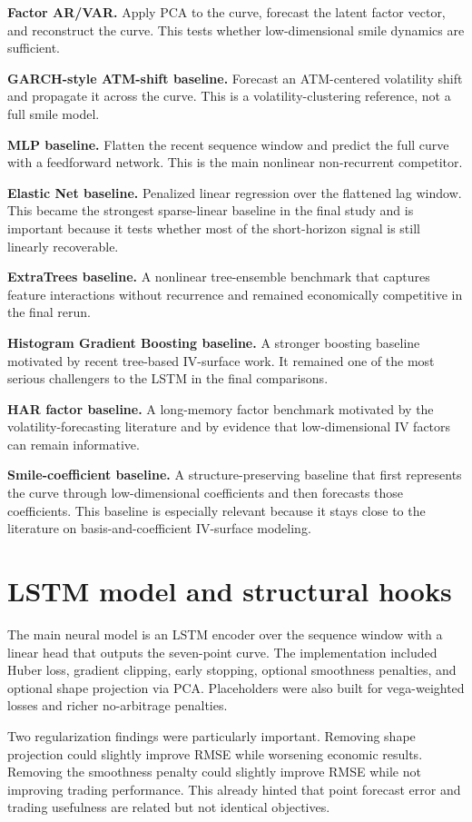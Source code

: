 \documentclass[12pt]{report}
\begin{document}
\textbf{Factor AR/VAR.} Apply PCA to the curve, forecast the latent factor vector, and reconstruct the curve. This tests whether low-dimensional smile dynamics are sufficient.

\textbf{GARCH-style ATM-shift baseline.} Forecast an ATM-centered volatility shift and propagate it across the curve. This is a volatility-clustering reference, not a full smile model.

\textbf{MLP baseline.} Flatten the recent sequence window and predict the full curve with a feedforward network. This is the main nonlinear non-recurrent competitor.

\textbf{Elastic Net baseline.} Penalized linear regression over the flattened lag window. This became the strongest sparse-linear baseline in the final study and is important because it tests whether most of the short-horizon signal is still linearly recoverable.

\textbf{ExtraTrees baseline.} A nonlinear tree-ensemble benchmark that captures feature interactions without recurrence and remained economically competitive in the final rerun.

\textbf{Histogram Gradient Boosting baseline.} A stronger boosting baseline motivated by recent tree-based IV-surface work. It remained one of the most serious challengers to the LSTM in the final comparisons.

\textbf{HAR factor baseline.} A long-memory factor benchmark motivated by the volatility-forecasting literature and by evidence that low-dimensional IV factors can remain informative.

\textbf{Smile-coefficient baseline.} A structure-preserving baseline that first represents the curve through low-dimensional coefficients and then forecasts those coefficients. This baseline is especially relevant because it stays close to the literature on basis-and-coefficient IV-surface modeling.

\section{LSTM model and structural hooks}
The main neural model is an LSTM encoder over the sequence window with a linear head that outputs the seven-point curve. The implementation included Huber loss, gradient clipping, early stopping, optional smoothness penalties, and optional shape projection via PCA. Placeholders were also built for vega-weighted losses and richer no-arbitrage penalties.

Two regularization findings were particularly important. Removing shape projection could slightly improve RMSE while worsening economic results. Removing the smoothness penalty could slightly improve RMSE while not improving trading performance. This already hinted that point forecast error and trading usefulness are related but not identical objectives.
\end{document}
